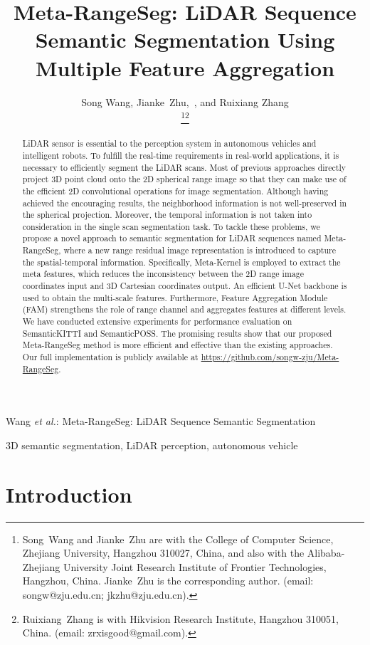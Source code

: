 \documentclass[letterpaper, 10 pt, journal, twoside]{ieeetran}
\title{Meta-RangeSeg: LiDAR Sequence Semantic Segmentation Using Multiple Feature Aggregation}
\author{
Song Wang, Jianke~Zhu,~\IEEEmembership{Senior~Member,~IEEE}, and Ruixiang Zhang


\thanks{Song~Wang and Jianke~Zhu are with the College of Computer Science, Zhejiang University, Hangzhou 310027, China, and also with the Alibaba-Zhejiang University
Joint Research Institute of Frontier Technologies, Hangzhou, China. Jianke~Zhu is the corresponding author. (email: songw@zju.edu.cn; jkzhu@zju.edu.cn). }\thanks{Ruixiang~Zhang is with Hikvision Research Institute, Hangzhou 310051, China. (email: zrxisgood@gmail.com).}


}
\begin{document}
\maketitle

{Wang \MakeLowercase{\textit{et al.}}: Meta-RangeSeg: LiDAR Sequence Semantic Segmentation}

\begin{abstract}
LiDAR sensor is essential to the perception system in autonomous vehicles and intelligent robots. To fulfill the real-time requirements in real-world applications, it is necessary to efficiently segment the LiDAR scans. Most of previous approaches directly project 3D point cloud onto the 2D spherical range image so that they can make use of the efficient 2D convolutional operations for image segmentation. Although having achieved the encouraging results, the neighborhood information is not well-preserved in the spherical projection. Moreover, the temporal information is not taken into consideration in the single scan segmentation task. To tackle these problems, we propose a novel approach to semantic segmentation for LiDAR sequences named Meta-RangeSeg, where a new range residual image representation is introduced to capture the spatial-temporal information. Specifically, Meta-Kernel is employed to extract the meta features, which reduces the inconsistency between the 2D range image coordinates input and 3D Cartesian coordinates output. An efficient U-Net backbone is used to obtain the multi-scale features. Furthermore, Feature Aggregation Module (FAM) strengthens the role of range channel and aggregates features at different levels. We have conducted extensive experiments for performance evaluation on SemanticKITTI and SemanticPOSS. The promising results show that our proposed Meta-RangeSeg method is more efficient and effective than the existing approaches. Our full implementation is publicly available at \url{https://github.com/songw-zju/Meta-RangeSeg}.
\end{abstract}

\begin{IEEEkeywords}
3D semantic segmentation, LiDAR perception, autonomous vehicle
\end{IEEEkeywords}

\section{Introduction}
\label{sec:intro}
\end{document}

